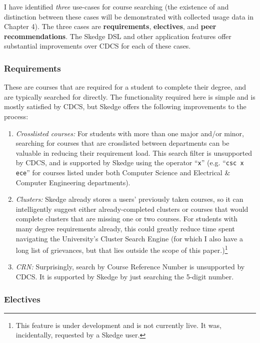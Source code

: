 I have identified \emph{three} use-cases for course searching (the existence of and distinction between these cases will be demonstrated with collected usage data in Chapter 4). The three cases are \textbf{requirements}, \textbf{electives}, and \textbf{peer recommendations}. The Skedge DSL and other application features offer substantial improvements over CDCS for each of these cases. 

  \subsubsection{Requirements}

  These are courses that are required for a student to complete their degree, and are typically searched for directly. The functionality required here is simple and is mostly satisfied by CDCS, but Skedge offers the following improvements to the process:

  \begin{enumerate}
    \item \emph{Crosslisted courses:} For students with more than one major and/or minor, searching for courses that are crosslisted between departments can be valuable in reducing their requirement load. This search filter is unsupported by CDCS, and is supported by Skedge using the operator ``{\tt x}'' (e.g. ``{\tt csc x ece}'' for courses listed under both Computer Science and Electrical \& Computer Engineering departments).

    \item \emph{Clusters:} Skedge already stores a users' previously taken courses, so it can intelligently suggest either already-completed clusters or courses that would complete clusters that are missing one or two courses. For students with many degree requirements already, this could greatly reduce time spent navigating the University's Cluster Search Engine (for which I also have a long list of grievances, but that lies outside the scope of this paper.)\footnote{This feature is under development and is not currently live. It was, incidentally, requested by a Skedge user.}

    \item \emph{CRN:} Surprisingly, search by Course Reference Number is unsupported by CDCS. It is supported by Skedge by just searching the 5-digit number.
  \end{enumerate}

  \subsubsection{Electives}

